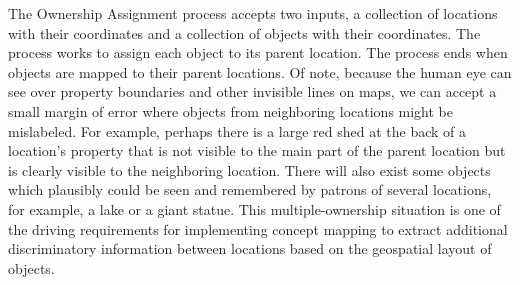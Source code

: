 The Ownership Assignment process accepts two inputs, a collection of locations with their coordinates and a collection of objects with their coordinates. 
The process works to assign each object to its parent location. 
The process ends when objects are mapped to their parent locations. Of note, because the human eye can see over property boundaries and other invisible lines on maps, we can accept a small margin of error where objects from neighboring locations might be mislabeled. For example, perhaps there is a large red shed at the back of a location's property that is not visible to the main part of the parent location but is clearly visible to the neighboring location.
There will also exist some objects which plausibly could be seen and remembered by patrons of several locations, for example, a lake or a giant statue. 
This multiple-ownership situation is one of the driving requirements for implementing concept mapping to extract additional discriminatory information between locations based on the geospatial layout of objects. 